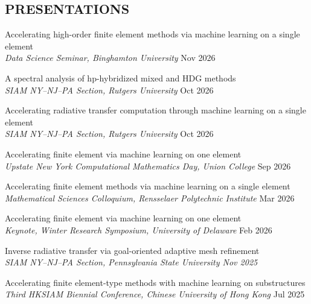 \documentclass[11pt]{res}
\newenvironment{cvenumerate}{\begin{etaremune}\itemsep -2pt}{\end{etaremune}\vspace{-5pt}}
\begin{document}
\begin{resume}
\section{PRESENTATIONS}
\begin{cvenumerate}
\item[]
\hspace{-1cm}{\bf Invited talks}

\item
Accelerating high-order finite element methods via machine learning on a single element\\
{\sl Data Science Seminar, Binghamton University}
\hfill Nov 2026

\item
A spectral analysis of hp-hybridized mixed and HDG methods\\
{\sl SIAM NY--NJ--PA Section, Rutgers University}
\hfill Oct 2026

\item
Accelerating radiative transfer computation through machine learning on a single element\\
{\sl SIAM NY--NJ--PA Section, Rutgers University}
\hfill Oct 2026

\item
Accelerating finite element via machine learning on one element\\
{\sl Upstate New York Computational Mathematics Day, Union College}
\hfill Sep 2026

\item
Accelerating finite element methods via machine learning on a single element\\
{\sl Mathematical Sciences Colloquium, Rensselaer Polytechnic Institute}
\hfill Mar 2026

\item
Accelerating finite element via machine learning on one element\\
{\sl Keynote, Winter Research Symposium, University of Delaware}
\hfill Feb 2026

\item
Inverse radiative transfer via goal-oriented adaptive
mesh refinement\\
{
\sl SIAM NY--NJ--PA Section, Pennsylvania State University
\hfill Nov 2025
}

\item
Accelerating finite element-type methods with machine
learning on substructures\\
{\sl Third HKSIAM Biennial Conference, Chinese University of Hong Kong}
\hfill Jul 2025


\end{cvenumerate}
\end{resume}
\end{document}
